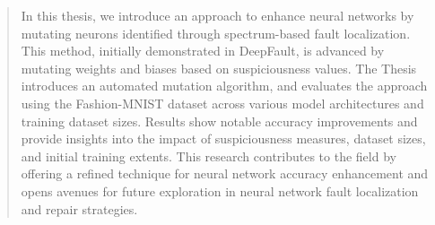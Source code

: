 \begin{quotation}
    In this thesis, we introduce an approach to enhance neural networks by mutating neurons identified through spectrum-based fault localization.
    This method, initially demonstrated in DeepFault, is advanced by mutating weights and biases based on suspiciousness values.
    The Thesis introduces an automated mutation algorithm, and evaluates the approach using the Fashion-MNIST dataset across various model architectures and training dataset sizes.
    Results show notable accuracy improvements and provide insights into the impact of suspiciousness measures, dataset sizes, and initial training extents.
    This research contributes to the field by offering a refined technique for neural network accuracy enhancement and opens avenues for future exploration in neural network fault localization and repair strategies.
\end{quotation}